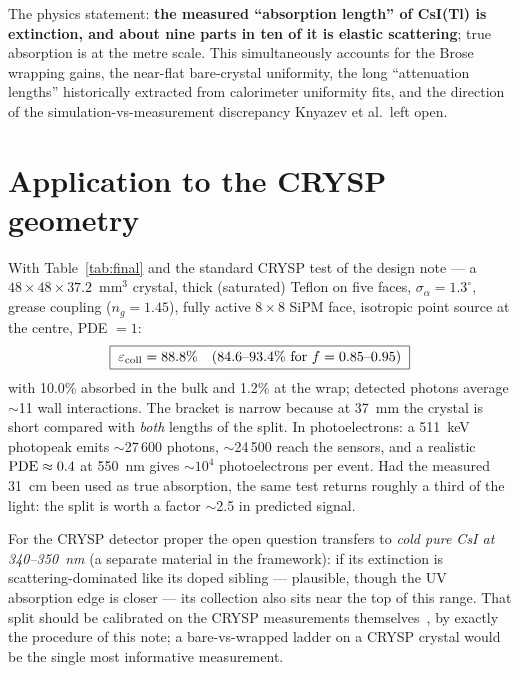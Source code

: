 \documentclass[11pt,a4paper]{article}
\newcommand{\csitl}{CsI(Tl)}
\newcommand{\sa}{\sigma_\alpha}
\begin{document}
The physics statement: \textbf{the measured ``absorption length'' of \csitl{} is
extinction, and about nine parts in ten of it is elastic scattering}; true absorption is
at the metre scale. This simultaneously accounts for the Brose wrapping gains, the
near-flat bare-crystal uniformity, the long ``attenuation lengths'' historically
extracted from calorimeter uniformity fits, and the direction of the
simulation-vs-measurement discrepancy Knyazev et al.\ left open.

\section{Application to the CRYSP geometry}
\label{sec:crysp}

With Table~\ref{tab:final} and the standard CRYSP test of the design note --- a
$48\times48\times37.2$~mm$^3$ crystal, thick (saturated) Teflon on five faces,
$\sa = 1.3^\circ$, grease coupling ($n_g = 1.45$), fully active $8\times8$ SiPM face,
isotropic point source at the centre, PDE $= 1$:
\begin{equation}
  \boxed{\;\varepsilon_{\rm coll} = 88.8\% \quad (84.6\text{--}93.4\% \text{ for }
  f = 0.85\text{--}0.95)\;}
\end{equation}
with 10.0\% absorbed in the bulk and 1.2\% at the wrap; detected photons average
$\sim$11 wall interactions. The bracket is narrow because at 37~mm the crystal is short
compared with \emph{both} lengths of the split. In photoelectrons: a 511~keV photopeak
emits $\sim$27\,600 photons, $\sim$24\,500 reach the sensors, and a realistic
${\rm PDE} \approx 0.4$ at 550~nm gives $\sim$$10^4$ photoelectrons per event. Had the
measured 31~cm been used as true absorption, the same test returns roughly a third of
the light: the split is worth a factor $\sim$2.5 in predicted signal.

For the CRYSP detector proper the open question transfers to \emph{cold pure CsI at
340--350~nm} (a separate material in the framework): if its extinction is
scattering-dominated like its doped sibling --- plausible, though the UV absorption edge
is closer --- its collection also sits near the top of this range. That split should be
calibrated on the CRYSP measurements themselves~\cite{soleti2024}, by exactly the
procedure of this note; a bare-vs-wrapped ladder on a CRYSP crystal would be the single
most informative measurement.

\end{document}
